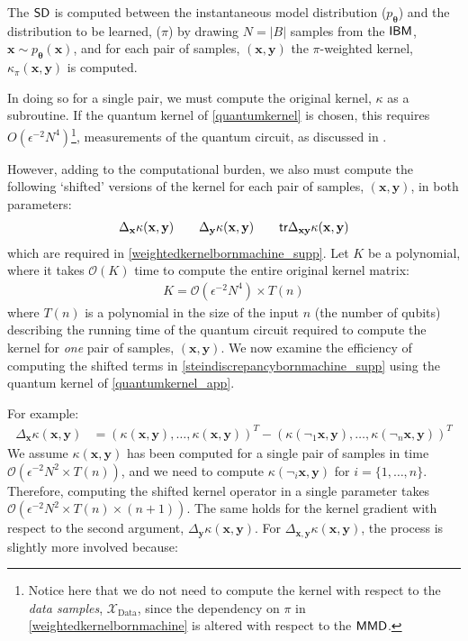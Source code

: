The $\operatorname{\textsf{SD}}$ is computed between the instantaneous model distribution ($p_{\boldsymbol\theta}$) and the distribution to be learned, ($\pi$) by drawing $N = |B|$ samples from the $\textsf{IBM}$, $\mathbf{x}\sim p_{\boldsymbol\theta}(\mathbf{x})$, and for each pair of samples, $(\mathbf{x}, \mathbf{y})$ the $\pi$-weighted kernel, $\kappa_\pi(\mathbf{x}, \mathbf{y})$ is computed.

In doing so for a single pair, we must compute the original kernel, $\kappa$ as a subroutine. If the quantum kernel of \eqref{quantumkernel} is chosen, this requires $O\left(\epsilon^{-2}N^4\right)$\footnote{Notice here that we do not need to compute the kernel with respect to the \textit{data samples}, $\mathcal{X}_{\text{Data}}$, since the dependency on $\pi$ in \eqref{weightedkernelbornmachine} is altered with respect to the $\operatorname{\textsf{MMD}}$.}, measurements of the quantum circuit, as discussed in  .

However, adding to the computational burden, we also must compute the following `shifted' versions of the kernel for each pair of samples, $(\mathbf{x}, \mathbf{y})$, in both parameters:
\begin{align}
    \Delta_\mathbf{x}\kappa(\mathbf{x}, \mathbf{y}) \qquad \Delta_\mathbf{y}\kappa(\mathbf{x}, \mathbf{y}) \qquad  \textsf{tr}\Delta_{\mathbf{x}\mathbf{y}}\kappa(\mathbf{x}, \mathbf{y})
\end{align}
which are required in \eqref{weightedkernelbornmachine_supp}. Let $K$ be a polynomial, where it takes $\mathcal{O}(K)$ time to compute the entire original kernel matrix:
\begin{align}
    K = \mathcal{O}(\epsilon^{-2}N^4) \times T(n)
\end{align}
where $T(n)$ is a polynomial in the size of the input $n$ (the number of qubits) describing the running time of the quantum circuit required to compute the kernel for \textit{one} pair of samples, $(\mathbf{x}, \mathbf{y})$. We now examine the efficiency of computing the shifted terms in \eqref{steindiscrepancybornmachine_supp} using the quantum kernel of \eqref{quantumkernel_app}.

For example:
\begin{align}
    \Delta_{\mathbf{x}}\kappa(\mathbf{x}, \mathbf{y}) &= (\kappa(\mathbf{x}, \mathbf{y}), \dots, \kappa(\mathbf{x}, \mathbf{y}))^T- (\kappa(\neg_1\mathbf{x}, \mathbf{y}), \dots, \kappa(\neg_n\mathbf{x}, \mathbf{y}))^T \label{xshiftedterm}
\end{align}
We assume $\kappa(\mathbf{x}, \mathbf{y})$ has been computed for a single pair of samples in time $\mathcal{O}(\epsilon^{-2}N^2 \times T(n))$, and we need to compute $\kappa(\neg_i\mathbf{x}, \mathbf{y})$ for $i = \{1,\dots, n\}$. Therefore, computing the shifted kernel operator in a single parameter takes $\mathcal{O}(\epsilon^{-2}N^2 \times T(n)\times (n+1))$. The same holds for the kernel gradient with respect to the second argument, $\Delta_\mathbf{y}\kappa(\mathbf{x}, \mathbf{y})$.
For $\Delta_{\mathbf{x}, \mathbf{y}}\kappa(\mathbf{x}, \mathbf{y})$, the process is slightly more involved because:


